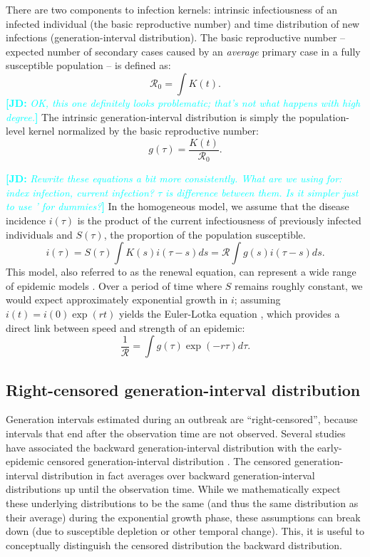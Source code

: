 \documentclass[12pt]{article}
\newcommand{\RR}{\ensuremath{{\mathcal R}}}
\newcommand{\comment}[3]{\textcolor{#1}{\textbf{[#2: }\textsl{#3}\textbf{]}}}
\newcommand{\jd}[1]{\comment{cyan}{JD}{#1}}
\begin{document}
There are two components to infection kernels: intrinsic infectiousness of an infected individual (the basic reproductive number) and time distribution of new infections (generation-interval distribution).
The basic reproductive number -- expected number of secondary cases caused by an \emph{average} primary case in a fully susceptible population -- is defined as: 
\begin{equation}
\RR_0 = \int K(t).
\end{equation}
\jd{OK, this one definitely looks problematic; that's not what happens with high degree.}
The intrinsic generation-interval distribution is simply the population-level kernel normalized by the basic reproductive number:
\begin{equation}
g(\tau) = \frac{K(t)}{\RR_0}.
\end{equation}

\jd{Rewrite these equations a bit more consistently. What are we using for: index infection, current infection? $\tau$ is difference between them. Is it simpler just to use ' for dummies?}
In the homogeneous model, we assume that the disease incidence $i(\tau)$ is the product of the current infectiousness of previously infected individuals and $S(\tau)$, the proportion of the population susceptible.
\begin{equation}
i(\tau) = S(\tau) \int K(s) i(\tau-s) ds = \RR \int g(s) i(\tau-s) ds.
\end{equation}
This model, also referred to as the renewal equation, can represent a wide range of epidemic models \citep{heesterbeek1996concept, diekmann2000mathematical, roberts2004modelling, aldis2005integral, wallinga2007generation, roberts2007model}.
Over a period of time where $S$ remains roughly constant, we would expect approximately exponential growth in $i$; assuming $i(t) = i(0) \exp(r t)$ yields the Euler-Lotka equation \citep{lotka1907relation}, which provides a direct link between speed and strength of an epidemic:
\begin{equation}
\frac{1}{\RR} = \int g(\tau) \exp(-r \tau) d\tau.
\end{equation}

\subsection{Right-censored generation-interval distribution}

Generation intervals estimated during an outbreak are ``right-censored'', because intervals that end after the observation time are not observed. 
Several studies have associated the backward generation-interval distribution with the early-epidemic censored generation-interval distribution \citep{tomba2010some, nishiura2010time, champredon2015intrinsic, britton2019estimation}. 
The censored generation-interval distribution in fact averages over backward generation-interval distributions up until the observation time.
While we mathematically expect these underlying distributions to be the same (and thus the same distribution as their average) during the exponential growth phase, these assumptions can break down (due to susceptible depletion or other temporal change).
This, it is useful to conceptually distinguish the censored distribution the backward distribution.
\end{document}
